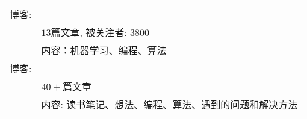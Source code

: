 %
%



\begin{tabular}{rl}
    \textsc{博客:} & \href{https://www.zhihu.com/people/calmdog/posts}{\color{blue}{知乎-横竖一个张}} \\
    \textsc{ } & \emph{$13$}篇文章, 被关注者: \emph{$3800$} \\ 
    \textsc{ } & 内容：机器学习、编程、算法\\
    \textsc{博客:} & \href{https://www.zybuluo.com/zsh-o/note/1249042}{\color{blue}{https://www.zybuluo.com/zsh-o/note/1249042}} \\
    \textbf{ } & \emph{$40+$}篇文章 \\
    \textbf{ } & 内容: 读书笔记、想法、编程、算法、遇到的问题和解决方法
\end{tabular}